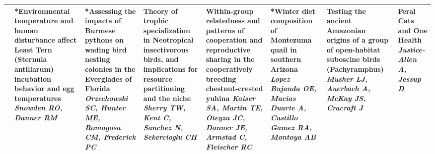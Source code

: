 \begin{tabular}{|x{0.85cm}|x{2.85cm}|x{2.85cm}|x{2.85cm}|x{2.85cm}|x{2.85cm}|x{2.85cm}|a{2.85cm}|}
&*Environmental temperature and human disturbance affect Least Tern (Sternula antillarum) incubation behavior and egg temperatures \newline \newline \textit{Snowden RO, Danner RM} & *Assessing the impacts of Burmese pythons on wading bird nesting colonies in the Everglades of Florida \newline \newline \textit{Orzechowski SC, Hunter ME, Romagosa CM, Frederick PC} & Theory of trophic specialization in Neotropical insectivorous birds, and implications for resource partitioning and the niche \newline \newline \textit{Sherry TW, Kent C, Sanchez N, Sekercioglu CH} & Within-group relatedness and patterns of cooperation and reproductive sharing in the cooperatively breeding chestnut-crested yuhina \newline \newline \textit{Kaiser SA, Martin TE, Oteyza JC, Danner JE, Armstad C, Fleischer RC} & *Winter diet composition of Montezuma quail in southern Arizona \newline \newline \textit{Lopez Bujanda OE, Macias Duarte A, Castillo Gamez RA, Montoya AB} & Testing the ancient Amazonian origins of a group of open-habitat suboscine birds (Pachyramphus) \newline \newline \textit{Musher LJ, Auerbach A, McKay JS, Cracraft J} & Feral Cats and One Health \newline \newline \textit{Justice-Allen A, Jessup D}\\
\hline

\end{tabular}
